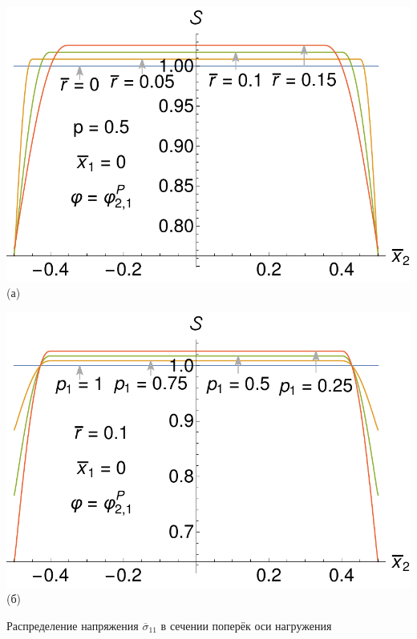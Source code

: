 \begin{frame}
	\begin{minipage}{0.4\textwidth}
		\centering
		\includegraphics[width=\textwidth]{pics/HeatFluxStabilityVariationRPresentation.pdf} \\
		(а)
	\end{minipage}
	\begin{minipage}{0.4\textwidth}
		\centering
		\includegraphics[width=\textwidth]{pics/HeatFluxStabilityVariationP1Presentation.pdf} \\
		(б)
	\end{minipage}
	
	Распределение напряжения $\overline{\sigma}_{11}$ в сечении поперёк оси нагружения
\end{frame}

